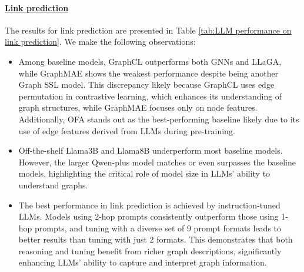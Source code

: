 \paragraph{\underline{Link prediction}}




The results for link prediction are presented in Table \ref{tab:LLM performance on link prediction}. We make the following observations:
\begin{itemize}

\item Among baseline models, GraphCL outperforms both GNNs and LLaGA, while GraphMAE shows the weakest performance despite being another Graph SSL model. This discrepancy likely because GraphCL uses edge permutation in contrastive learning, which enhances its understanding of graph structures, while GraphMAE focuses only on node features. Additionally, OFA stands out as the best-performing baseline likely due to its use of edge features derived from LLMs during pre-training.

\item Off-the-shelf Llama3B and Llama8B underperform most baseline models. However, the larger Qwen-plus model matches or even surpasses the baseline models, highlighting the critical role of model size in LLMs’ ability to understand graphs.

\item The best performance in link prediction is achieved by instruction-tuned LLMs. Models using 2-hop prompts consistently outperform those using 1-hop prompts, and tuning with a diverse set of 9 prompt formats leads to better results than tuning with just 2 formats. This demonstrates that both reasoning and tuning benefit from richer graph descriptions, significantly enhancing LLMs’ ability to capture and interpret graph information.

\end{itemize}



